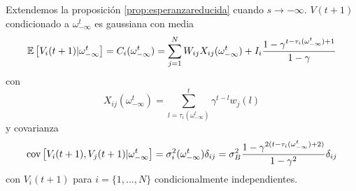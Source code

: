 \begin{prop}\label{prop:modelo}
Extendemos la proposición \ref{prop:esperanzareducida} cuando $s \rightarrow-\infty$. $V(t+1)$ condicionado a $\omega_{-\infty}^t$ es gaussiana con media
\begin{equation}
    \mathbb{E} \left[V_i(t+1) | \omega_{-\infty}^t\right] = C_i(\omega_{-\infty}^t) =
    \sum_{j=1}^N W_{ij} X_{ij}(\omega_{-\infty}^t) + I_i \frac{1-\gamma^{t-\tau_i(\omega_{-\infty}^t)+1}}{1-\gamma}
\end{equation}
con
\begin{equation}
    X_{ij}(\omega_{-\infty}^t) = 
    \sum_{l=\tau_i(\omega_{-\infty}^t)}^t \gamma^{t-l} w_j(l)
\end{equation}
y covarianza
\begin{equation}
    \text{cov}\left[V_i(t+1),V_j(t+1) | \omega_{-\infty}^t\right] = \sigma_i^2(\omega_{-\infty}^t) \delta_{ij} = \sigma_B^2 \frac{1-\gamma^{2(t-\tau_i(\omega_{-\infty}^t)+2)}}{1-\gamma^2} \delta_{ij}
\end{equation}
con $V_i(t+1)$ para $i=\{1,...,N\}$ condicionalmente independientes.
\end{prop}
